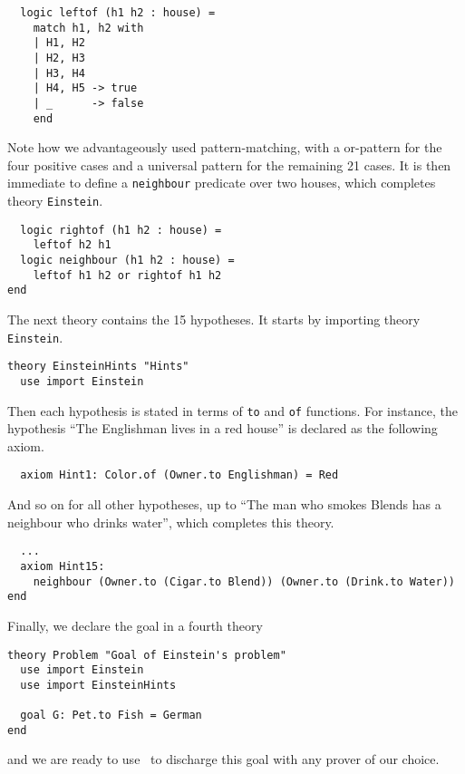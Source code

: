 \begin{verbatim}
  logic leftof (h1 h2 : house) =
    match h1, h2 with
    | H1, H2
    | H2, H3
    | H3, H4
    | H4, H5 -> true
    | _      -> false
    end
\end{verbatim}
Note how we advantageously used pattern-matching, with a or-pattern
for the four positive cases and a universal pattern for the remaining
21 cases. It is then immediate to define a \texttt{neighbour}
predicate over two houses, which completes theory \texttt{Einstein}.
\begin{verbatim}
  logic rightof (h1 h2 : house) =
    leftof h2 h1
  logic neighbour (h1 h2 : house) =
    leftof h1 h2 or rightof h1 h2
end
\end{verbatim}

The next theory contains the 15 hypotheses. It starts by importing
theory \texttt{Einstein}.
\begin{verbatim}
theory EinsteinHints "Hints"
  use import Einstein
\end{verbatim}
Then each hypothesis is stated in terms of \texttt{to} and \texttt{of}
functions. For instance, the hypothesis ``The Englishman lives in a
red house'' is declared as the following axiom.
\begin{verbatim}
  axiom Hint1: Color.of (Owner.to Englishman) = Red
\end{verbatim}
And so on for all other hypotheses, up to
``The man who smokes Blends has a neighbour who drinks water'', which completes
this theory.
\begin{verbatim}
  ...
  axiom Hint15:
    neighbour (Owner.to (Cigar.to Blend)) (Owner.to (Drink.to Water))
end
\end{verbatim}
Finally, we declare the goal in a fourth theory
\begin{verbatim}
theory Problem "Goal of Einstein's problem"
  use import Einstein
  use import EinsteinHints

  goal G: Pet.to Fish = German
end
\end{verbatim}
and we are ready to use \why\ to discharge this goal with any prover
of our choice.

